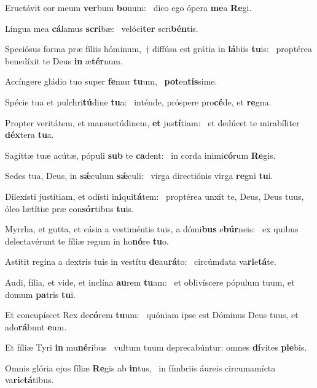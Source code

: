 \item Eructávit cor meum \textbf{ver}bum \textbf{bo}num:~\psstar{} dico ego ópera \textbf{me}a \textbf{Re}gi.
\item Lingua mea \textbf{cá}lamus \textbf{scri}bæ:~\psstar{} velóci\textbf{ter} scri\textbf{bén}tis.
\item Speciósus forma præ fíliis hóminum,~† diffúsa est grátia in \textbf{lá}biis \textbf{tu}is:~\psstar{} proptérea benedíxit te Deus \textbf{in} æ\textbf{tér}num.
\item Accíngere gládio tuo super \textbf{fe}mur \textbf{tu}um,~\psstar{} \textbf{pot}en\textbf{tís}sime.
\item Spécie tua et pulchri\textbf{tú}dine \textbf{tu}a:~\psstar{} inténde, próspere pro\textbf{cé}de, et \textbf{re}gna.
\item Propter veritátem, et mansuetúdinem, \textbf{et} jus\textbf{tí}tiam:~\psstar{} et dedúcet te mirabíliter \textbf{déx}tera \textbf{tu}a.
\item Sagíttæ tuæ acútæ, pópuli \textbf{sub} te \textbf{ca}dent:~\psstar{} in corda inimi\textbf{có}rum \textbf{Re}gis.
\item Sedes tua, Deus, in \textbf{sǽ}culum \textbf{sǽ}culi:~\psstar{} virga directiónis virga \textbf{re}gni \textbf{tu}i.
\item Dilexísti justítiam, et odísti in\textbf{i}qui\textbf{tá}tem:~\psstar{} proptérea unxit te, Deus, Deus tuus, óleo lætítiæ præ con\textbf{sór}tibus \textbf{tu}is.
\item Myrrha, et gutta, et cásia a vestiméntis tuis, a dómi\textbf{bus} e\textbf{búr}neis:~\psstar{} ex quibus delectavérunt te fíliæ regum in ho\textbf{nó}re \textbf{tu}o.
\item Astitit regína a dextris tuis in vestítu \textbf{de}au\textbf{rá}to:~\psstar{} circúmdata va\textbf{ri}e\textbf{tá}te.
\item Audi, fília, et vide, et inclína \textbf{au}rem \textbf{tu}am:~\psstar{} et oblivíscere pópulum tuum, et domum \textbf{pa}tris \textbf{tu}i.
\item Et concupíscet Rex de\textbf{có}rem \textbf{tu}um:~\psstar{} quóniam ipse est Dóminus Deus tuus, et ado\textbf{rá}bunt \textbf{e}um.
\item Et fíliæ Tyri \textbf{in} mu\textbf{né}ribus~\psstar{} vultum tuum deprecabúntur: omnes \textbf{dí}vites \textbf{ple}bis.
\item Omnis glória ejus fíliæ \textbf{Re}gis ab \textbf{in}tus,~\psstar{} in fímbriis áureis circumamícta va\textbf{ri}e\textbf{tá}tibus.
